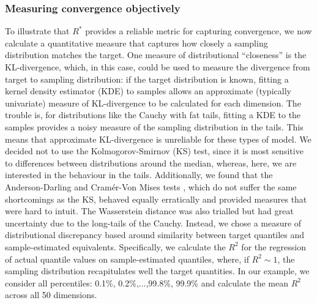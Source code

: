 \documentclass{article}
\begin{document}
\subsubsection{Measuring convergence objectively}\label{sec:cauchy_objective}
To illustrate that $R^*$ provides a reliable metric for capturing convergence, we now calculate a quantitative measure that captures how closely a sampling distribution matches the target. One measure of distributional ``closeness'' is the KL-divergence, which, in this case, could be used to measure the divergence from target to sampling distribution: if the target distribution is known, fitting a kernel density estimator (KDE) to samples allows an approximate (typically univariate) measure of KL-divergence to be calculated for each dimension. The trouble is, for distributions like the Cauchy with fat tails, fitting a KDE to the samples provides a noisy measure of the sampling distribution in the tails. This means that approximate KL-divergence is unreliable for these types of model. We decided not to use the Kolmogorov-Smirnov (KS) test, since it is most sensitive to differences between distributions around the median, whereas, here, we are interested in the behaviour in the tails. Additionally, we found that the Anderson-Darling and Cram\'er-Von Mises tests \citep{faraway2019goftest}, which do not suffer the same shortcomings as the KS, behaved equally erratically and provided measures that were hard to intuit. The Wasserstein distance was also trialled but had great uncertainty due to the long-tails of the Cauchy. Instead, we chose a measure of distributional discrepancy based around similarity between target quantiles and sample-estimated equivalents. Specifically, we calculate the $R^2$ for the regression of actual quantile values on sample-estimated quantiles, where, if $R^2\sim 1$, the sampling distribution recapitulates well the target quantities. In our example, we consider all percentiles: 0.1\%, 0.2\%,...,99.8\%, 99.9\% and calculate the mean $R^2$ across all 50 dimensions.
\end{document}
